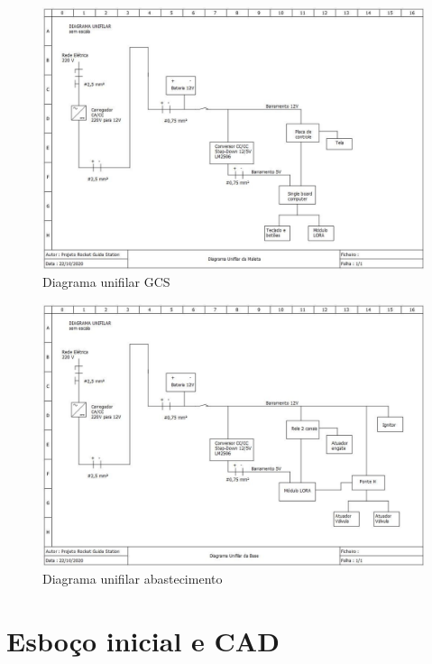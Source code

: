 \begin{apendicesenv}
\begin{figure}[H]
    \centering
    \includegraphics[width=1.0\textwidth, angle=270]{figuras/diamalgcs.jpeg}
    \caption{Diagrama unifilar GCS}
    \label{fig:diagrama_unifilar_01}
\end{figure}

\begin{figure}[H]
    \centering
    \includegraphics[width=1.0\textwidth, angle=270]{figuras/diamalsup.jpeg}
    \caption{Diagrama unifilar abastecimento}
    \label{fig:diagrama_unifilar_02}
\end{figure}





\chapter{Esboço inicial e CAD}
\label{CAD}


\end{apendicesenv}
